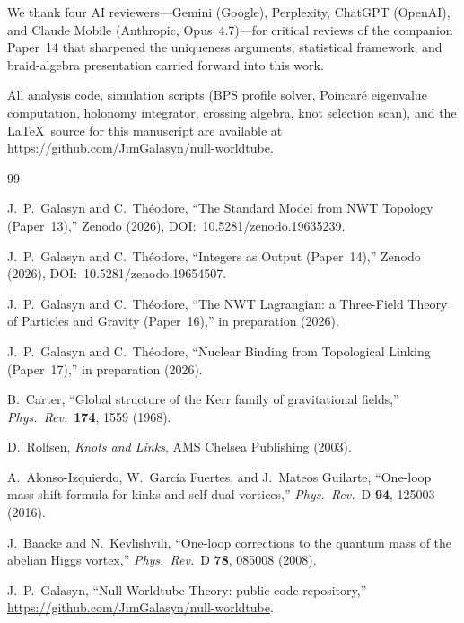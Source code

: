 \documentclass[11pt]{article}
\begin{document}
We thank four AI reviewers---Gemini (Google), Perplexity,
ChatGPT (OpenAI), and Claude Mobile (Anthropic, Opus~4.7)---for
critical reviews of the companion Paper~14 that sharpened the
uniqueness arguments, statistical framework, and braid-algebra
presentation carried forward into this work.

All analysis code, simulation scripts (BPS profile solver,
Poincar\'e eigenvalue computation, holonomy integrator,
crossing algebra, knot selection scan), and the \LaTeX\ source
for this manuscript are available at
\url{https://github.com/JimGalasyn/null-worldtube}.

\begin{thebibliography}{99}

  J.~P.~Galasyn and C.~Th\'eodore,
  ``The Standard Model from NWT Topology (Paper~13),''
  Zenodo (2026), DOI:~10.5281/zenodo.19635239.

  J.~P.~Galasyn and C.~Th\'eodore,
  ``Integers as Output (Paper~14),''
  Zenodo (2026), DOI:~10.5281/zenodo.19654507.

  J.~P.~Galasyn and C.~Th\'eodore,
  ``The NWT Lagrangian: a Three-Field Theory of Particles and
  Gravity (Paper~16),''
  in preparation (2026).

  J.~P.~Galasyn and C.~Th\'eodore,
  ``Nuclear Binding from Topological Linking (Paper~17),''
  in preparation (2026).

  B.~Carter,
  ``Global structure of the Kerr family of gravitational fields,''
  \emph{Phys.\ Rev.}\ \textbf{174}, 1559 (1968).

  D.~Rolfsen,
  \emph{Knots and Links},
  AMS Chelsea Publishing (2003).

  A.~Alonso-Izquierdo, W.~Garc\'ia Fuertes, and J.~Mateos Guilarte,
  ``One-loop mass shift formula for kinks and
  self-dual vortices,''
  \emph{Phys.\ Rev.}\ D \textbf{94}, 125003 (2016).

  J.~Baacke and N.~Kevlishvili,
  ``One-loop corrections to the quantum mass of the
  abelian Higgs vortex,''
  \emph{Phys.\ Rev.}\ D \textbf{78}, 085008 (2008).

  J.~P.~Galasyn,
  ``Null Worldtube Theory: public code repository,''
  \url{https://github.com/JimGalasyn/null-worldtube}.

\end{thebibliography}
\end{document}
